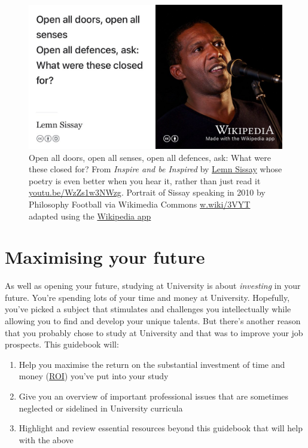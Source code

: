 \documentclass[
]{book}
\providecommand{\tightlist}{%
  \setlength{\itemsep}{0pt}\setlength{\parskip}{0pt}}
\begin{document}
\begin{figure}

{\centering \includegraphics[width=0.99\linewidth]{images/lemninspire} 

}

\caption{Open all doors, open all senses, open all defences, ask: What were these closed for? From \emph{Inspire and be Inspired} by \href{https://en.wikipedia.org/wiki/Lemn_Sissay}{Lemn Sissay} whose poetry is even better when you hear it, rather than just read it \href{https://youtu.be/WzZs1w3NWzg}{youtu.be/WzZs1w3NWzg}. \citep{sissay} Portrait of Sissay speaking in 2010 by Philosophy Football via Wikimedia Commons \href{https://w.wiki/3VYT}{w.wiki/3VYT} adapted using the \href{https://apps.apple.com/gb/app/wikipedia/id324715238}{Wikipedia app}}\label{fig:lemn-fig}
\end{figure}



\hypertarget{roi}{%
\section{Maximising your future}\label{roi}}

As well as opening your future, studying at University is about \emph{investing} in your future. You're spending lots of your time and money at University. Hopefully, you've picked a subject that stimulates and challenges you intellectually while allowing you to find and develop your unique talents. But there's another reason that you probably chose to study at University and that was to improve your job prospects. This guidebook will:

\begin{enumerate}
\def\labelenumi{\arabic{enumi}.}
\tightlist
\item
  Help you maximise the return on the substantial investment of time and money (\href{https://en.wikipedia.org/wiki/Return_on_investment}{ROI}) you've put into your study
\item
  Give you an overview of important professional issues that are sometimes neglected or sidelined in University curricula
\item
  Highlight and review essential resources beyond this guidebook that will help with the above
\end{enumerate}
\end{document}
